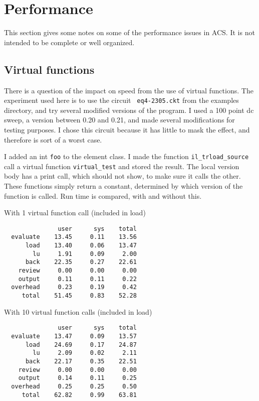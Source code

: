 \section{Performance}
This section gives some notes on some of the performance issues in
ACS.  It is not intended to be complete or well organized.
\subsection{Virtual functions}

There is a question of the impact on speed from the use of virtual
functions.  The experiment used here is to use the circuit {\tt
eq4-2305.ckt} from the examples directory, and try several modified
versions of the program.  I used a 100 point dc sweep, a version
between 0.20 and 0.21, and made several modifications for testing
purposes.  I chose this circuit because it has little to mask the
effect, and therefore is sort of a worst case.

I added an int {\tt foo} to the element class.  I made the function
{\tt il\_trload\_source} call a virtual function {\tt virtual\_test}
and stored the result.  The local version body has a print call,
which should not show,  to make sure it calls the other.  These
functions simply return a constant, determined by which version of
the function is called.  Run time is compared, with and without
this.

With 1 virtual function call (included in load)
\begin{verbatim}
               user      sys    total
  evaluate    13.45     0.11    13.56
      load    13.40     0.06    13.47
        lu     1.91     0.09     2.00
      back    22.35     0.27    22.61
    review     0.00     0.00     0.00
    output     0.11     0.11     0.22
  overhead     0.23     0.19     0.42
     total    51.45     0.83    52.28
\end{verbatim}

With 10 virtual function calls (included in load)
\begin{verbatim}
               user      sys    total
  evaluate    13.47     0.09    13.57
      load    24.69     0.17    24.87
        lu     2.09     0.02     2.11
      back    22.17     0.35    22.51
    review     0.00     0.00     0.00
    output     0.14     0.11     0.25
  overhead     0.25     0.25     0.50
     total    62.82     0.99    63.81
\end{verbatim}

